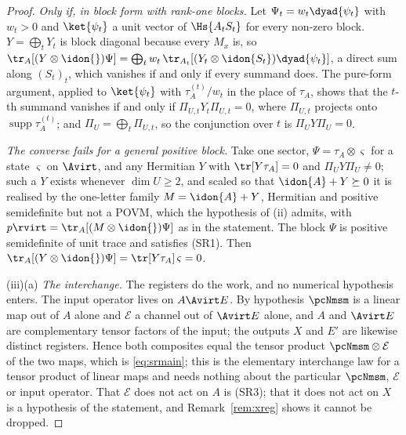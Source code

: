 \begin{proof}
\emph{Only if, in block form with rank-one blocks.} Let
$\Psi_t=w_t\dyad{\psi_t}$ with $w_t>0$ and $\ket{\psi_t}$ a unit vector of
$\Hs{A_tS_t}$ for every non-zero block. $Y=\bigoplus_tY_t$ is block diagonal
because every $M_x$ is, so
$\tr_A[(Y\otimes\idon{})\Psi]=\bigoplus_tw_t\,
\tr_{A_t}[(Y_t\otimes\idon{S_t})\dyad{\psi_t}]$, a direct sum along
$(S_t)_t$, which vanishes if and only if every summand does. The pure-form
argument, applied to $\ket{\psi_t}$ with $\tau^{(t)}_A/w_t$ in the place of
$\tau_A$, shows that the $t$-th summand vanishes if and only if
$\Pi_{U,t}Y_t\Pi_{U,t}=0$, where $\Pi_{U,t}$ projects onto
$\operatorname{supp}\tau^{(t)}_A$; and
$\Pi_U=\bigoplus_t\Pi_{U,t}$, so the conjunction over $t$ is
$\Pi_UY\Pi_U=0$.

\emph{The converse fails for a general positive block.} Take one sector,
$\Psi=\tau_A\otimes\varsigma$ for a state $\varsigma$ on $\Avirt$, and any
Hermitian $Y$ with $\tr[Y\tau_A]=0$ and $\Pi_UY\Pi_U\ne0$; such a $Y$
exists whenever $\dim U\ge2$, and scaled so that $\idon{A}+Y\succeq0$ it is
realised by the one-letter family $M=\idon{A}+Y$, Hermitian and positive
semidefinite but not a POVM, which the hypothesis of (ii) admits, with
$p\rvirt=\tr_A[(M\otimes\idon{})\Psi]$ as in the statement. The block
$\Psi$ is positive semidefinite of unit trace and satisfies (SR1). Then
$\tr_A[(Y\otimes\idon{})\Psi]=\tr[Y\tau_A]\,\varsigma=0$.

(iii)(a) \emph{The interchange.} The registers do the work, and no
numerical hypothesis enters. The input operator lives on $A\Avirt E$. By
hypothesis $\pcNmsm$ is a linear map out of $A$ alone and $\mathcal{E}$ a
channel out of $\Avirt E$ alone, and $A$ and $\Avirt E$ are complementary
tensor factors of the input; the outputs $X$ and $E'$ are likewise
distinct registers. Hence both composites equal the tensor product
$\pcNmsm\otimes\mathcal{E}$ of the two maps, which is \eqref{eq:srmain};
this is the elementary interchange law for a tensor product of linear maps
and needs nothing about the particular $\pcNmsm$, $\mathcal{E}$ or input
operator. That $\mathcal{E}$ does not act on $A$ is (SR3); that it does not
act on $X$ is a hypothesis of the statement, and Remark~\ref{rem:xreg}
shows it cannot be dropped.


\end{proof}

